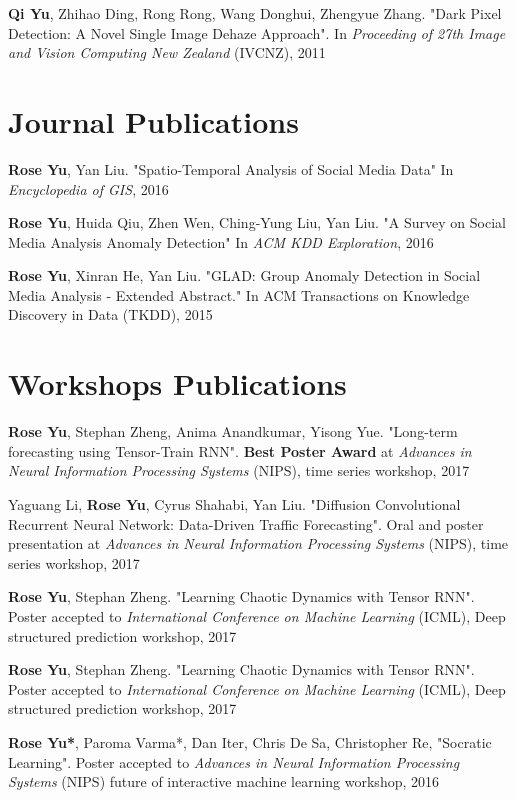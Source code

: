 \documentclass[margin,line]{res}
\begin{document}
\begin{resume}
{\bf Qi Yu}, Zhihao Ding, Rong Rong, Wang Donghui, Zhengyue Zhang. "Dark Pixel Detection: A Novel Single Image Dehaze Approach". In \textit{Proceeding of 27th Image and Vision Computing New Zealand }(IVCNZ), 2011  

 
\section{\sc Journal Publications}
{\bf Rose Yu},  Yan Liu.  "Spatio-Temporal Analysis of Social Media Data"  In \textit{Encyclopedia of GIS}, 2016

{\bf Rose Yu}, Huida Qiu, Zhen Wen, Ching-Yung Liu,  Yan Liu. "A Survey on Social Media Analysis  Anomaly Detection" In \textit{ACM KDD Exploration},  2016

{\bf Rose Yu}, Xinran He, Yan Liu. "GLAD: Group Anomaly Detection in Social Media Analysis - Extended Abstract." In \textit{}ACM Transactions on Knowledge Discovery in Data  (TKDD), 2015


\section{\sc Workshops Publications}

{\bf Rose Yu}, Stephan Zheng, Anima Anandkumar, Yisong Yue. "Long-term forecasting using Tensor-Train RNN". \textbf{Best Poster Award} at \textit{Advances in Neural Information Processing Systems} (NIPS), time series workshop, 2017


Yaguang Li, {\bf Rose Yu}, Cyrus Shahabi, Yan Liu. "Diffusion Convolutional Recurrent Neural Network: Data-Driven Traffic Forecasting". Oral and poster presentation at \textit{Advances in Neural Information Processing Systems} (NIPS), time series workshop, 2017



{\bf Rose Yu}, Stephan Zheng. "Learning Chaotic Dynamics with Tensor RNN". Poster accepted to \textit{International Conference on Machine Learning} (ICML), Deep structured prediction workshop, 2017

{\bf Rose Yu}, Stephan Zheng. "Learning Chaotic Dynamics with Tensor RNN". Poster accepted to \textit{International Conference on Machine Learning} (ICML), Deep structured prediction workshop, 2017

{\bf Rose Yu*},  Paroma Varma*, Dan Iter, Chris De Sa, Christopher Re,  "Socratic Learning".  Poster accepted to \textit{Advances in Neural Information Processing Systems}  (NIPS) future of interactive machine learning workshop, 2016



\end{resume}
\end{document}
